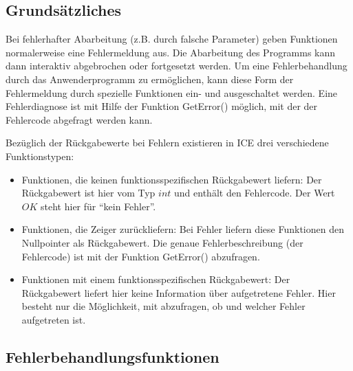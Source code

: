 
\subsection{Grundsätzliches}
\label{Fehlerbehandlung}
Bei fehlerhafter Abarbeitung (z.B. durch falsche Parameter) geben Funktionen
normalerweise eine Fehlermeldung aus. Die Abarbeitung des Programms kann dann
interaktiv abgebrochen oder fortgesetzt werden. Um eine Fehlerbehandlung durch
das Anwenderprogramm zu ermöglichen, kann diese Form der Fehlermeldung durch
spezielle Funktionen ein- und ausgeschaltet werden. Eine Fehlerdiagnose ist
mit Hilfe der Funktion GetError() möglich, mit der der Fehlercode abgefragt 
werden kann.

\noindent Bezüglich der Rückgabewerte bei Fehlern existieren in ICE drei 
verschiedene Funktionstypen:
\begin{itemize}
\item Funktionen, die keinen funktionsspezifischen Rückgabewert liefern: Der
Rückgabewert ist hier vom Typ $int$ und enthält den Fehlercode. Der Wert
$OK$ steht hier für ``kein Fehler''.
\item Funktionen, die Zeiger zurückliefern: Bei Fehler liefern diese
Funktionen den Nullpointer als Rückgabewert. Die genaue Fehlerbeschreibung 
(der Fehlercode) ist mit der Funktion GetError() abzufragen.
\item Funktionen mit einem funktionsspezifischen Rückgabewert: Der
Rückgabewert liefert hier keine Information über aufgetretene Fehler. 
Hier besteht nur die Möglichkeit, mit  abzufragen, ob und 
welcher Fehler aufgetreten ist.
\end{itemize}
\subsection{Fehlerbehandlungsfunktionen}
